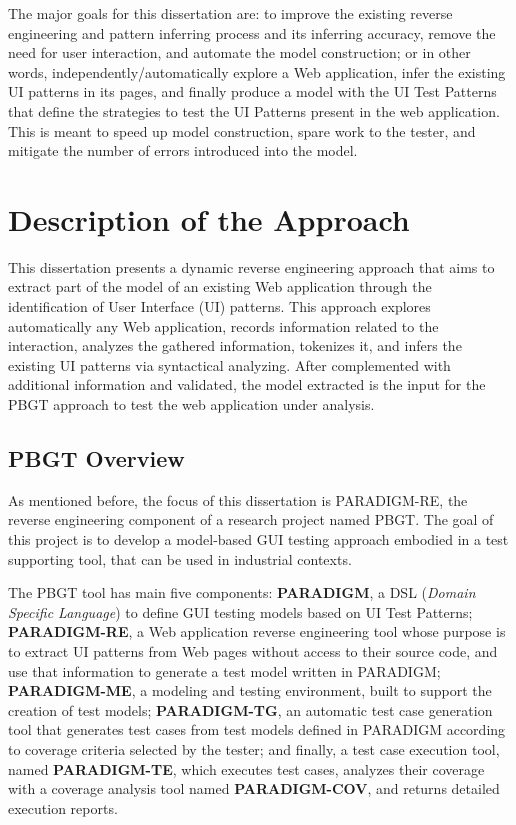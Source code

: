 \documentclass[9pt,a4paper]{extarticle}
\begin{document}
\begin{multicols}{2}
The major goals for this dissertation are: to improve the existing reverse engineering and pattern inferring process and its inferring accuracy, remove the need for user interaction, and automate the model construction; or in other words, independently/automatically explore a Web application, infer the existing UI patterns in its pages, and finally produce a model with the UI Test Patterns that define the strategies to test the UI Patterns present in the web application. This is meant to speed up model construction, spare work to the tester, and mitigate the number of errors introduced into the model.

\section{Description of the Approach}\label{sec:work}
This dissertation presents a dynamic reverse engineering approach that aims to extract part of the model of an existing Web application through the identification of User Interface (UI) patterns. This approach explores automatically any Web application, records information related to the interaction, analyzes the gathered information, tokenizes it, and infers the existing UI patterns via syntactical analyzing. After complemented with additional information and validated, the model extracted is the input for the PBGT approach to test the web application under analysis.

\subsection{PBGT Overview}\label{sec:pbgt}

As mentioned before, the focus of this dissertation is PARADIGM-RE, the reverse engineering component of a research project named PBGT. The goal of this project is to develop a model-based GUI testing approach embodied in a test supporting tool, that can be used in industrial contexts.

The PBGT tool has main five components: \textbf{PARADIGM}, a DSL (\textit{Domain Specific Language}) to define GUI testing models based on UI Test Patterns; \textbf{PARADIGM-RE}, a Web application reverse engineering tool whose purpose is to extract UI patterns from Web pages without access to their source code, and use that information to generate a test model written in PARADIGM; \textbf{PARADIGM-ME}, a modeling and testing environment, built to support the creation of test models; \textbf{PARADIGM-TG}, an automatic test case generation tool that generates test cases from test models defined in PARADIGM according to coverage criteria selected by the tester; and finally, a test case execution tool, named \textbf{PARADIGM-TE}, which executes test cases, analyzes their coverage with a coverage analysis tool named \textbf{PARADIGM-COV}, and returns detailed execution reports.


\end{multicols}
\end{document}
